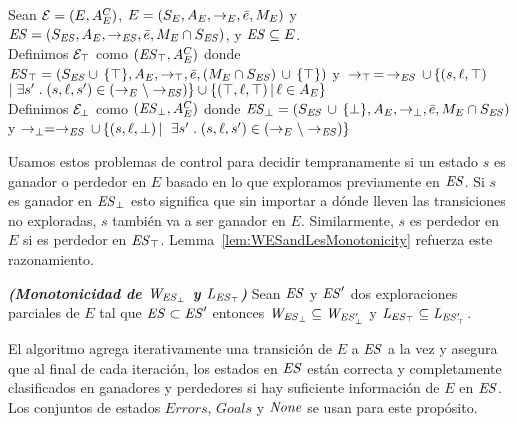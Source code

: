 \begin{definition}
 \label{def:unexploredTo}

Sean $\mathcal{E} = (E, A_E^C)$, $E = (S_E,A_E,\rightarrow_E,\bar{e},M_E)$ y $\mathit{ES} = 
(S_{\mathit{ES}},A_E, \rightarrow_{\mathit{ES}},\bar{e},M_E \cap S_{\mathit{ES}})$, y $\mathit{ES} 
\subseteq E$.
\\
Definimos $\mathcal{E}_\top$ como $(\mathit{\mathit{ES}_{\top}}, A_E^C)$ donde 
$\mathit{\mathit{ES}_{\top}} = (S_{\mathit{ES}} \cup \, \{\top\},A_E,\rightarrow_\top, 
\bar{e}, 
(M_E \cap S_{\mathit{ES}})\, \cup \, \{\top\})$ y $\, \rightarrow_\top \, = \, \rightarrow_{\mathit{ES}} 
\, 
\cup\, \{(s,\ell, \top) 
\;$ $ | \; \exists s' \;.\; (s, \ell, s') \in (\rightarrow_E \setminus \rightarrow_{\mathit{ES}})\} \cup \{(\top, \ell, \top) \, | \, \ell \in A_E\}$ \\
Definimos $\mathcal{E}_\bot$ como $(\mathit{\mathit{ES}_{\bot}}, A_E^C)$ donde 
$\mathit{\mathit{ES}_{\bot}} = (S_{\mathit{ES}} \, \cup \, 
\{\bot\},A_E,\rightarrow_\bot, 
\bar{e}, M_E \cap S_{\mathit{ES}})$ y $\rightarrow_\bot = \rightarrow_{\mathit{ES}} \, \cup \, \{(s,\ell, 
\bot) \, | \, $ $ \exists s' \;.\; (s, \ell, s') \in (\rightarrow_E \setminus \rightarrow_{\mathit{ES}})\}$ 
\end{definition}

Usamos estos problemas de control para decidir tempranamente si un estado $s$ es ganador o perdedor en $E$ basado en lo que exploramos previamente en $\mathit{ES}$. Si $s$ es ganador en $\mathit{\mathit{ES}_{\bot}}$ esto significa que sin importar a dónde lleven las transiciones no exploradas, $s$ también va a ser ganador en $E$. Similarmente, $s$ es perdedor en $E$ si es perdedor en $\mathit{\mathit{ES}_{\top}}$.
Lemma~\ref{lem:WESandLesMonotonicity} refuerza este razonamiento.


\begin{lemma}\textbf{\emph{(Monotonicidad de $\mathit{W_{\mathit{\mathit{ES}_{\bot}}}}$ y $\mathit{L_{\mathit{\mathit{ES}_{\top}}}}$)}}
\label{lem:WESandLesMonotonicity}
Sean $\mathit{ES}$ y $\mathit{ES}'$ dos exploraciones parciales de $E$ tal que $\mathit{ES} 
\subset \mathit{ES}'$ entonces $\mathit{W_{\mathit{\mathit{ES}_{\bot}}}} \subseteq \mathit{W_{\mathit{\mathit{ES}'_{\bot}}}}$ y $\mathit{L_{\mathit{\mathit{ES}_{\top}}}} \subseteq 
\mathit{L_{\mathit{\mathit{ES}'_{\top}}}}$.
\end{lemma}

El algoritmo agrega iterativamente una transición de $E$ a $\mathit{ES}$ a la vez y asegura que al final de cada iteración, los estados en $\mathit{ES}$ están correcta y completamente clasificados en ganadores y perdedores si hay suficiente información de $E$ en $\mathit{ES}$. Los conjuntos de estados $Errors$, 
$Goals$ y $\mathit{None}$ se usan para este propósito.

